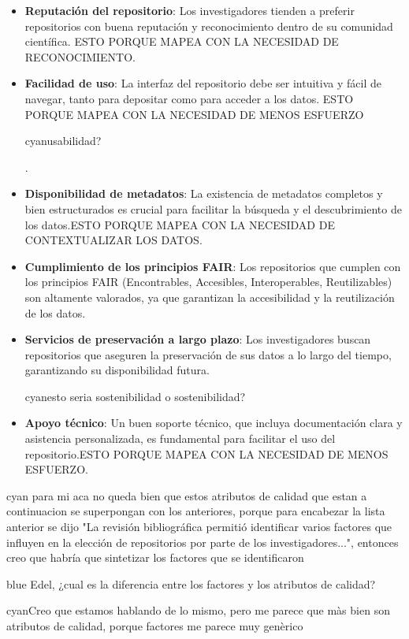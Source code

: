 \documentclass[runningheads]{llncs}
\def \bchgon {\begin{color}{blue}}
\def \echgon {\end{color}}
\def \bchedel {\begin{color}{cyan}}
\def \echedel {\end{color}}
\begin{document}
\begin{itemize}
    \item \textbf{Reputación del repositorio}: Los investigadores tienden a preferir repositorios con buena reputación y reconocimiento dentro de su comunidad científica. ESTO PORQUE MAPEA CON LA NECESIDAD DE RECONOCIMIENTO.
    \item \textbf{Facilidad de uso}: La interfaz del repositorio debe ser intuitiva y fácil de navegar, tanto para depositar como para acceder a los datos. ESTO PORQUE MAPEA CON LA NECESIDAD DE MENOS ESFUERZO \bchedel usabilidad? \echedel.
    \item \textbf{Disponibilidad de metadatos}: La existencia de metadatos completos y bien estructurados es crucial para facilitar la búsqueda y el descubrimiento de los datos.ESTO PORQUE MAPEA CON LA NECESIDAD DE CONTEXTUALIZAR LOS DATOS.
    \item \textbf{Cumplimiento de los principios FAIR}: Los repositorios que cumplen con los principios FAIR (Encontrables, Accesibles, Interoperables, Reutilizables) son altamente valorados, ya que garantizan la accesibilidad y la reutilización de los datos.
    \item \textbf{Servicios de preservación a largo plazo}: Los investigadores buscan repositorios que aseguren la preservación de sus datos a lo largo del tiempo, garantizando su disponibilidad futura. \bchedel esto seria sostenibilidad o sostenibilidad? \echedel
    \item \textbf{Apoyo técnico}: Un buen soporte técnico, que incluya documentación clara y asistencia personalizada, es fundamental para facilitar el uso del repositorio.ESTO PORQUE MAPEA CON LA NECESIDAD DE MENOS ESFUERZO.
\end{itemize}


\bchedel
para mi aca no queda bien que estos atributos de calidad que estan a continuacion se superpongan con los anteriores, porque para encabezar la lista anterior se dijo "La revisión bibliográfica permitió identificar varios factores que influyen en la elección de repositorios por parte de los investigadores...", entonces creo que habría que sintetizar los factores que se identificaron\\
\echedel
\bchgon
Edel, ¿cual es la diferencia entre los factores y los atributos de calidad?
\echgon \bchedel Creo que estamos hablando de lo mismo, pero me parece que màs bien son atributos de calidad, porque factores me parece muy genèrico  \echedel
\end{document}
